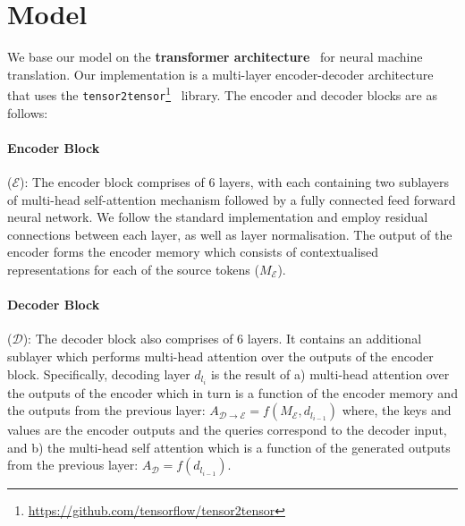\documentclass[11pt,a4paper]{article}
\begin{document}
\section{Model}
\label{sec:model}

We base our model on the {\bf transformer architecture}~\cite{vaswani2017attention} for neural machine translation. Our implementation is a multi-layer encoder-decoder architecture that uses the \texttt{tensor2tensor}\footnote{\url{https://github.com/tensorflow/tensor2tensor}}~\cite{vaswani2018tensor2tensor} library. The encoder and decoder blocks are as follows: 

\paragraph{Encoder Block} ($\mathcal{E}$):  The encoder block comprises of $6$ layers, with each containing two sublayers of multi-head self-attention mechanism followed by a fully connected feed forward neural network. We follow the standard implementation and employ residual connections between each layer, as well as layer normalisation. The output of the encoder forms the encoder memory which consists of contextualised representations for each of the source tokens ($M_{\mathcal{E}}$).

\paragraph{Decoder Block} ($\mathcal{D}$): The decoder block also comprises of $6$ layers. It contains an additional sublayer which performs multi-head attention over the outputs of the encoder block. Specifically, decoding layer $d_{l_i}$ is the result of a) multi-head attention over the outputs of the encoder which in turn is a function of the encoder memory and the outputs from the previous layer: $A_{\mathcal{D}{\rightarrow}\mathcal{E}} = f(M_{\mathcal{E}}, d_{l_{i-1}})$ where, the keys and values are the encoder outputs and the queries correspond to the decoder input, and b) the multi-head self attention which is a function of the generated outputs from the previous layer: $A_{\mathcal{D}} = f(d_{l_{i-1}})$. 
\end{document}
